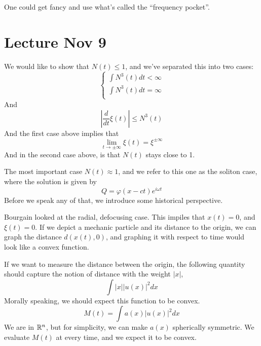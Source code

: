     \begin{note}
        One could get fancy and use what's called the ``frequency pocket''.
    \end{note}



\section{Lecture Nov 9}
We would like to show that $N(t)\leq 1$, and we've separated this into two cases:
\begin{equation*}
    \begin{cases}
        \int N^3(t)dt<\infty\\
        \int N^3(t)dt=\infty\\
    \end{cases}
\end{equation*}
And 
\begin{equation*}
    \left|\frac{d}{dt}\xi(t)\right|\leq N^3(t)
\end{equation*}
And the first case above implies that 
\begin{equation*}
    \lim_{t\to\pm\infty}\xi(t)=\xi^{\pm\infty}
\end{equation*}
And in the second case above, is that $N(t)$ stays close to 1.

The most important case $N(t)\approx 1$, and we refer to this one as the soliton case, where the solution is given by 
\begin{equation*}
    Q=\varphi(x-ct)e^{i\omega t}
\end{equation*}
Before we speak any of that, we introduce some historical perspective.

Bourgain looked at the radial, defocusing case. This impiles that $x(t)=0$, and $\xi(t)=0$. If we depict a mechanic particle and its distance to the origin, we can graph the distance $d(x(t), 0)$, and graphing it with respect to time would look like a convex function.

If we want to measure the distance between the origin, the following quantity should capture the notion of distance with the weight $|x|$,
\begin{equation*}
    \int |x||u(x)|^2dx
\end{equation*}
Morally speaking, we should expect this function to be convex. 
\begin{equation*}
    M(t)=\int a(x)|u(x)|^2dx
\end{equation*}
We are in $\mathbb{R}^n$, but for simplicity, we can make $a(x)$ spherically symmetric. We evaluate $M(t)$ at every time, and we expect it to be convex.

